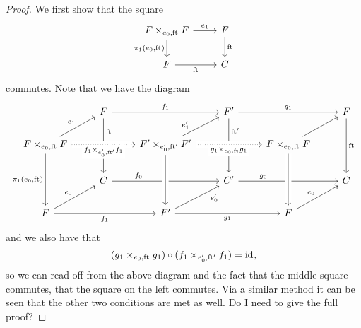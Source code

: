 \begin{proof}
We first show that the square
\begin{equation*}
\begin{tikzcd}
\stesysff 
  \ar{r}{\efamext} 
  \ar{d}[swap]{\pullbackpr{1}{\ectxext}{\eft}} 
  & 
\stesysf 
  \ar{d}{\eft}
  \\
\stesysf
  \ar{r}[swap]{\eft} 
  & 
\stesysc
\end{tikzcd}
\end{equation*}
commutes. Note that we have the diagram
\begin{equation*}
\begin{tikzcd}
  {}
  & 
\stesysf
  \ar{dd}[near start]{\eft}
  \ar{rr}{f_1}
  &
  &
\stesysf'
  \ar{dd}[near start]{\eft'}
  \ar{rr}{g_1}
  &
  &
\stesysf
  \ar{dd}{\eft}
  \\
\pullback{\stesysf}{\stesysf}{\ectxext}{\eft}
  \ar{dd}[swap]{\pullbackpr{1}{\ectxext}{\eft}}
  \ar[crossing over,dotted]{rr}[swap,fill=white]{\pullback{f_1}{f_1}{\ectxext'}{\eft'}}
  \ar{ur}{\efamext}
  &
  &
\pullback{\stesysf'}{\stesysf'}{\ectxext'}{\eft'} 
  \ar{ur}[near start]{\efamext'}
  \ar[crossing over,dotted]{rr}[swap,fill=white]{\pullback{g_1}{g_1}{\ectxext}{\eft}}
  &
  &
\pullback{\stesysf}{\stesysf}{\ectxext}{\eft}
  \ar{ur}%
  \\
  {}
  &
\stesysc
  \ar{rr}[near start]{f_0}
  &
  &
\stesysc'
  \ar{rr}[near start]{g_0}
  &
  &
\stesysc
  \\
\stesysf 
  \ar{rr}[swap]{f_1}
  \ar{ur}{\ectxext}
  &
  &
\stesysf' 
  \ar[crossing over,leftarrow]{uu}[near end,swap]{}
  \ar{ur}[swap,near end]{\ectxext'}
  \ar{rr}[swap]{g_1}
  &
  &
\stesysf
  \ar[crossing over,leftarrow]{uu}[near end,swap]{}
  \ar{ur}{\ectxext}
\end{tikzcd}
\end{equation*}
and we also have that
\begin{equation*}
(\pullback{g_1}{g_1}{\ectxext}{\eft})\circ(\pullback{f_1}{f_1}{\ectxext'}{\eft'})
=\catid{},
\end{equation*}
so we can read off from the above diagram and the fact that the middle square
commutes, that the square on the left commutes. Via a similar method it can
be seen that the other two conditions are met as well.
{\color{red} Do I need to give the full proof?}
\end{proof}

